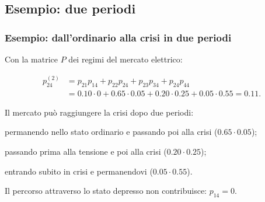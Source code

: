 \subsection{Esempio: due periodi}%

\begin{frame}%
%

\frametitle{Esempio: dall'ordinario alla crisi in due periodi}%
%

%


Con la matrice $P$ dei regimi del mercato elettrico:%

\[%
\begin{split}
p_{24}^{(2)}  &  = p_{21}p_{14} + p_{22}p_{24} + p_{23}p_{34} + p_{24}p_{44}\\
&  = 0.10\cdot0 + 0.65\cdot0.05 + 0.20\cdot0.25 + 0.05\cdot0.55 = 0.11.
\end{split}
\]


\medskip

Il mercato pu\`{o} raggiungere la crisi dopo due periodi:

\begin{stepitemize}
\item permanendo nello stato ordinario e passando poi alla crisi
($0.65\cdot0.05$);

\item passando prima alla tensione e poi alla crisi ($0.20\cdot0.25$);

\item entrando subito in crisi e permanendovi ($0.05\cdot0.55$).
\end{stepitemize}

\medskip

\begin{center}
{\small Il percorso attraverso lo stato depresso non contribuisce: $p_{14}%
=0$.}
\end{center}

%

\transboxout
\end{frame}%


